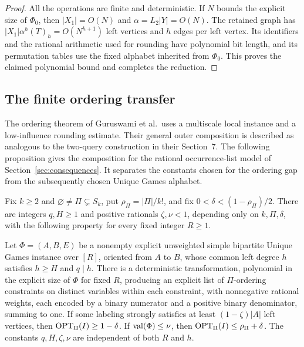 \begin{proof}
All the operations are finite and deterministic.  If \(N\) bounds the
explicit size of \(\Phi_0\), then \(|X_1|=O(N)\) and
\(\alpha=L_2|Y|=O(N)\).  The retained graph has
\(|X_1|\alpha^h(T)_h=O(N^{h+1})\) left vertices and \(h\) edges per
left vertex.  Its identifiers and the rational arithmetic used for
rounding have polynomial bit length, and its permutation tables use
the fixed alphabet inherited from \(\Phi_0\).  This proves the claimed
polynomial bound and completes the reduction.
\end{proof}

\subsection{The finite ordering transfer}

The ordering theorem of Guruswami et al.\ uses a multiscale local
instance and a low-influence rounding estimate.  Their general
outer composition is described as analogous to the two-query
construction in their Section~7.  The following proposition gives
the composition for the rational occurrence-list model of
Section~\ref{sec:consequences}.  It separates the constants chosen
for the ordering gap from the subsequently chosen Unique Games
alphabet.

\begin{proposition}
\label{prop:finite-ordering-transfer}
Fix \(k\ge2\) and \(\varnothing\ne\Pi\subsetneq S_k\), put
\(\rho_\Pi=|\Pi|/k!\), and fix
\(0<\delta<(1-\rho_\Pi)/2\).  There are integers
\(q,H\ge1\) and positive rationals \(\zeta,\nu<1\), depending only
on \(k,\Pi,\delta\), with the following property for every fixed
integer \(R\ge1\).

Let \(\Phi=(A,B,E)\) be a nonempty explicit unweighted simple
bipartite Unique Games instance over \([R]\), oriented from \(A\) to
\(B\), whose common left degree \(h\) satisfies \(h\ge H\) and
\(q\mid h\).  There is a deterministic transformation, polynomial in
the explicit size of \(\Phi\) for fixed \(R\), producing an explicit
list of \(\Pi\)-ordering constraints on distinct variables within
each constraint, with nonnegative rational weights, each encoded by
a binary numerator and a positive binary denominator, summing to one.
If some labeling strongly satisfies at least
\((1-\zeta)|A|\) left vertices, then \(\operatorname{OPT}_\Pi(I)\ge1-\delta\).
If \(\operatorname{val}(\Phi)\le\nu\), then
\(\operatorname{OPT}_\Pi(I)\le\rho_\Pi+\delta\).
The constants \(q,H,\zeta,\nu\) are independent of both \(R\) and
\(h\).
\end{proposition}


